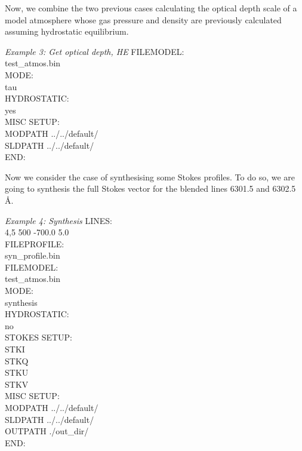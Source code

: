 %

Now, we combine the two previous cases calculating the optical depth scale of a model atmosphere whose gas pressure and density are previously calculated assuming hydrostatic equilibrium.

\begin{ifbox}[label={tb:example03}]{{\it Example 3: Get optical depth, HE}}
  \scriptsize
FILEMODEL:\\
test\_atmos.bin\\
MODE:\\
tau\\
HYDROSTATIC:\\
yes\\
MISC SETUP:\\
MODPATH ../../default/\\
SLDPATH ../../default/\\
END:
  \normalsize
\end{ifbox}


%

Now we consider the case of synthesising some Stokes profiles. To do so, we are going to synthesis the full Stokes vector for the blended lines 6301.5 and 6302.5 {\AA}.

\begin{ifbox}[label={tb:example04}]{{\it Example 4: Synthesis}}
  \scriptsize
LINES:\\
4,5 500 -700.0 5.0\\
FILEPROFILE:\\
syn\_profile.bin\\
FILEMODEL:\\
test\_atmos.bin\\
MODE:\\
synthesis\\
HYDROSTATIC:\\
no\\
STOKES SETUP:\\
STKI\\
STKQ\\
STKU\\
STKV\\
MISC SETUP:\\
MODPATH ../../default/\\
SLDPATH ../../default/\\
OUTPATH ./out\_dir/\\
END:
  \normalsize
\end{ifbox}

